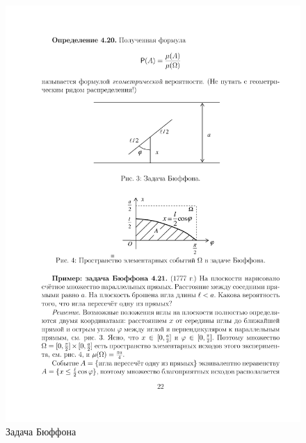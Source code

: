 \begin{figure}[H]
	\centering
	\includegraphics[]{pic/pic3}
	\caption{Задача Бюффона}
	\label{fig3}
\end{figure}
